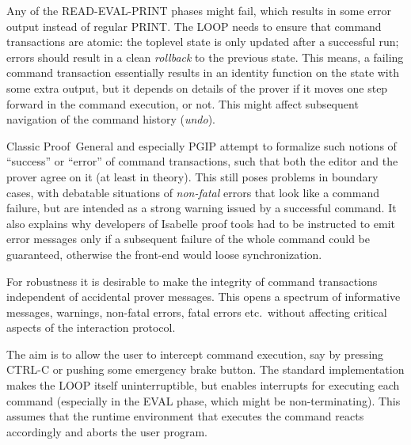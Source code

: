 \begin{isabellebody}
\begin{isamarkuptext}
   Any of the READ-EVAL-PRINT phases might
  fail, which results in some error output instead of regular PRINT.
  The LOOP needs to ensure that command transactions are atomic: the
  toplevel state is only updated after a successful run; errors should
  result in a clean \emph{rollback} to the previous state.  This
  means, a failing command transaction essentially results in an
  identity function on the state with some extra output, but it
  depends on details of the prover if it moves one step forward in the
  command execution, or not.  This might affect subsequent navigation
  of the command history (\emph{undo}).

  Classic Proof~General and especially PGIP attempt to formalize such
  notions of ``success'' or ``error'' of command transactions, such
  that both the editor and the prover agree on it (at least in
  theory).  This still poses problems in boundary cases, with
  debatable situations of \emph{non-fatal} errors that look like a
  command failure, but are intended as a strong warning issued by a
  successful command.  It also explains why developers of Isabelle
  proof tools had to be instructed to emit error messages only if a
  subsequent failure of the whole command could be guaranteed,
  otherwise the front-end would loose synchronization.

  For robustness it is desirable to make the integrity of command
  transactions independent of accidental prover messages.  This opens
  a spectrum of informative messages, warnings, non-fatal errors,
  fatal errors etc.\ without affecting critical aspects of the
  interaction protocol.

   The aim is to allow the user to
  intercept command execution, say by pressing CTRL-C or pushing some
  emergency brake button.  The standard implementation makes the LOOP
  itself uninterruptible, but enables interrupts for executing each
  command (especially in the EVAL phase, which might be
  non-terminating).  This assumes that the runtime environment that
  executes the command reacts accordingly and aborts the user program.


\end{isamarkuptext}
\end{isabellebody}
